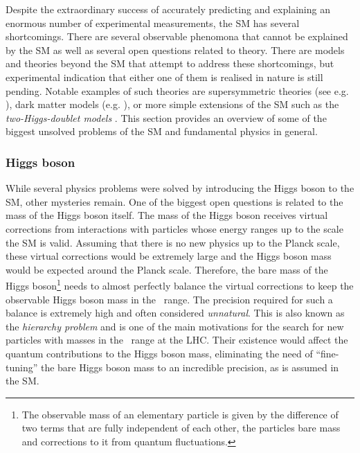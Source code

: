 Despite the extraordinary success of accurately predicting and explaining an enormous number of experimental measurements, the SM has several shortcomings.
There are several observable phenomona that cannot be explained by the SM as well as several open questions related to theory. 
There are models and theories beyond the SM that attempt to address these shortcomings, but experimental indication that either one of them is realised in nature is still pending.
Notable examples of such theories are supersymmetric theories (see e.g. ), dark matter models (e.g. ), or more simple extensions of the SM such as the \emph{two-Higgs-doublet models} \cite{Branco_2012}.
This section provides an overview of some of the biggest unsolved problems of the SM and fundamental physics in general.




\subsubsection{Higgs boson}
While several physics problems were solved by introducing the Higgs boson to the SM, other mysteries remain. 
One of the biggest open questions is related to the mass of the Higgs boson itself. 
The mass of the Higgs boson receives virtual corrections from interactions with particles whose energy ranges up to the scale the SM is valid.
Assuming that there is no new physics up to the Planck scale, these virtual corrections would be extremely large and the Higgs boson mass would be expected around the Planck scale. 
Therefore, the bare mass of the Higgs boson\footnote{The observable mass of an elementary particle is given by the difference of two terms that are fully independent of each other, the particles bare mass and corrections to it from quantum fluctuations.}
needs to almost perfectly balance the virtual corrections to keep the observable Higgs boson mass in the \GeV\ range. The precision required for such a balance is extremely high and often considered \emph{unnatural}.
This is also known as the \emph{hierarchy problem} and is one of the main motivations for the search for new particles with masses in the \TeV\ range at the LHC. 
Their existence would affect the quantum contributions to the Higgs boson mass, eliminating the need of ``fine-tuning'' the bare Higgs boson mass to an incredible precision, as is assumed in the SM. 

